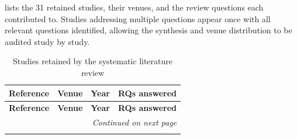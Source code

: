  lists the 31 retained studies, their venues, and the review questions each contributed to. Studies addressing multiple questions appear once with all relevant questions identified, allowing the synthesis and venue distribution to be audited study by study.

{\footnotesize
\begin{longtable}{p{2.2cm} p{7.6cm} c p{2.6cm}}
\caption{Studies retained by the systematic literature review}
\label{tab:corpus} \\
\toprule
\textbf{Reference} & \textbf{Venue} & \textbf{Year} & \textbf{RQs answered} \\
\midrule
\endfirsthead

\toprule
\textbf{Reference} & \textbf{Venue} & \textbf{Year} & \textbf{RQs answered} \\
\midrule
\endhead

\midrule
\multicolumn{4}{r}{\textit{Continued on next page}} \\
\bottomrule
\endfoot

\bottomrule
\endlastfoot


\end{longtable}}
